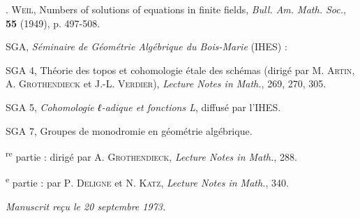 \documentclass[10pt,leqno]{article}
\begin{document}
\noindent [\(4] \). \textsc{Weil}, Numbers of solutions of equations in finite fields, \emph{Bull. Am. Math. Soc.}, \textbf{55} (1949), p. 497-508.\par

\noindent SGA, \emph{Séminaire de Géométrie Algébrique du Bois-Marie} (IHES) :\par

\noindent SGA 4, Théorie des topos et cohomologie étale des schémas (dirigé par \(\mathrm{M}\). \textsc{Artin}, \(\mathrm{A}\). \textsc{Grothendieck} et J.-L. \textsc{Verdier}), \emph{Lecture Notes in Math.}, 269, 270, 305.\par

\noindent SGA 5, \emph{Cohomologie ℓ-adique et fonctions L}, diffusé par l'IHES.\par

\noindent SGA 7, Groupes de monodromie en géométrie algébrique.\par

\textsuperscript{re} partie : dirigé par \(\mathrm{A}\). \textsc{Grothendieck}, \emph{Lecture Notes in Math.}, 288.\par

\textsuperscript{e} partie : par \(\mathrm{P}\). \textsc{Deligne} et \(\mathrm{N}\). \textsc{Katz}, \emph{Lecture Notes in Math.}, 340.\par

\begin{flushright}\emph{Manuscrit reçu le 20 septembre 1973.}\end{flushright}

\clearpage
\end{document}
